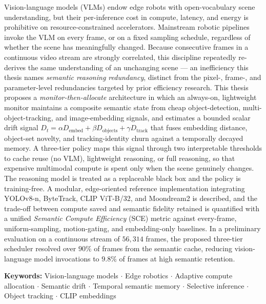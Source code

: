 \vspace{6mm}
Vision-language models (VLMs) endow edge robots with open-vocabulary scene understanding, but their per-inference cost in compute, latency, and energy is prohibitive on resource-constrained accelerators. Mainstream robotic pipelines invoke the VLM on every frame, or on a fixed sampling schedule, regardless of whether the scene has meaningfully changed. Because consecutive frames in a continuous video stream are strongly correlated, this discipline repeatedly re-derives the same understanding of an unchanging scene --- an inefficiency this thesis names \emph{semantic reasoning redundancy}, distinct from the pixel-, frame-, and parameter-level redundancies targeted by prior efficiency research. This thesis proposes a \emph{monitor-then-allocate} architecture in which an always-on, lightweight monitor maintains a composite semantic state from cheap object-detection, multi-object-tracking, and image-embedding signals, and estimates a bounded scalar drift signal $D_t = \alpha D_{\text{embed}} + \beta D_{\text{objects}} + \gamma D_{\text{track}}$ that fuses embedding distance, object-set novelty, and tracking-identity churn against a temporally decayed memory. A three-tier policy maps this signal through two interpretable thresholds to cache reuse (no VLM), lightweight reasoning, or full reasoning, so that expensive multimodal compute is spent only when the scene genuinely changes. The reasoning model is treated as a replaceable black box and the policy is training-free. A modular, edge-oriented reference implementation integrating YOLOv8-n, ByteTrack, CLIP ViT-B/32, and Moondream2 is described, and the trade-off between compute saved and semantic fidelity retained is quantified with a unified \emph{Semantic Compute Efficiency} (SCE) metric against every-frame, uniform-sampling, motion-gating, and embedding-only baselines. In a preliminary evaluation on a continuous stream of $56{,}314$ frames, the proposed three-tier scheduler resolved over $90\%$ of frames from the semantic cache, reducing vision-language model invocations to $9.8\%$ of frames at high semantic retention.

\vspace{5mm}
\noindent\textbf{Keywords:} Vision-language models $\cdot$ Edge robotics $\cdot$ Adaptive compute allocation $\cdot$ Semantic drift $\cdot$ Temporal semantic memory $\cdot$ Selective inference $\cdot$ Object tracking $\cdot$ CLIP embeddings


